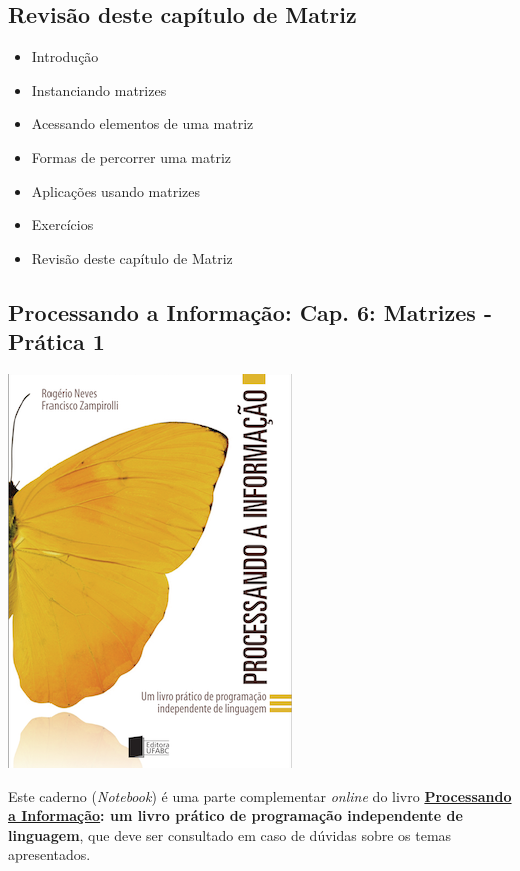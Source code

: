 \documentclass[12pt,a4paper]{article}
\providecommand{\tightlist}{%
      \setlength{\itemsep}{0pt}\setlength{\parskip}{0pt}}
\begin{document}
    \hypertarget{revisuxe3o-deste-capuxedtulo-de-matriz}{%
\subsection{Revisão deste capítulo de
Matriz}\label{revisuxe3o-deste-capuxedtulo-de-matriz}}

\begin{itemize}
\tightlist
\item
  Introdução
\item
  Instanciando matrizes
\item
  Acessando elementos de uma matriz
\item
  Formas de percorrer uma matriz
\item
  Aplicações usando matrizes
\item
  Exercícios
\item
  Revisão deste capítulo de Matriz
\end{itemize}

    \hypertarget{processando-a-informauxe7uxe3o-cap.-6-matrizes---pruxe1tica-1}{%
\subsection{Processando a Informação: Cap. 6: Matrizes - Prática
1}\label{processando-a-informauxe7uxe3o-cap.-6-matrizes---pruxe1tica-1}}

    \includegraphics{"figs/Capa_Processando_Informacao.jpg"}

Este caderno (\emph{Notebook}) é uma parte complementar \emph{online} do
livro
\textbf{\href{https://editora.ufabc.edu.br/matematica-e-ciencias-da-computacao/58-processando-a-informacao}{Processando
a Informação}: um livro prático de programação independente de
linguagem}, que deve ser consultado em caso de dúvidas sobre os temas
apresentados.
\end{document}
